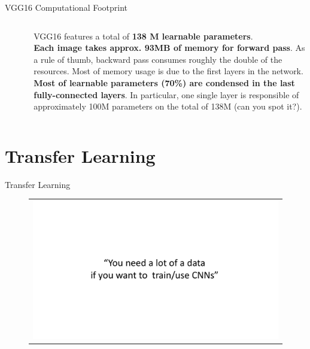 \documentclass[aspectratio=169]{beamer}
\begin{document}
\begin{frame}{VGG16 Computational Footprint}
\begin{columns}
\begin{column}{0.1\textwidth}
\begin{figure}
\begin{tabular}{c}
			\end{tabular}
		\end{figure}
	\end{column}
	\begin{column}{0.9\textwidth}
		VGG16 features a total of \textbf{138 M learnable parameters}.\\
		\vspace{0.5cm}
		\textbf{Each image takes approx. 93MB of memory for forward pass}. As a rule of thumb, backward pass consumes roughly the double of the resources. Most of memory usage is due to the first layers in the network.\\
		\vspace{0.5cm}
		\textbf{Most of learnable parameters (70\%) are condensed in the last fully-connected layers}. In particular, one single layer is responsible of approximately 100M parameters on the total of 138M (can you spot it?). 
	\end{column}
\end{columns}
\end{frame}

\section{Transfer Learning}


\begin{frame}{Transfer Learning}
\vspace{-1cm}
\begin{figure}
\begin{tabular}{c}
\includegraphics[width=\textwidth]{img/cnn/busted_0.pdf}
\end{tabular}
\end{figure}
\end{frame}
\end{document}
